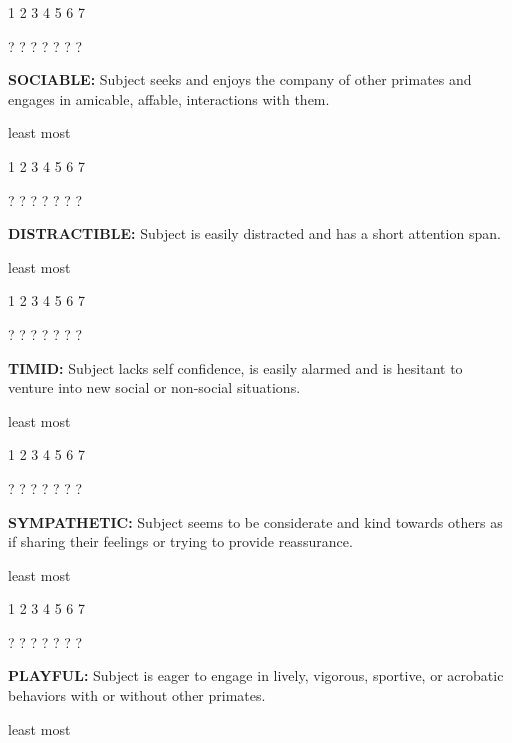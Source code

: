 \documentclass{article} %
\begin{document}
  1    2    3    4    5    6    7   

  ?    ?    ?    ?    ?    ?    ?   

\noindent  

\noindent \textbf{SOCIABLE:} Subject seeks and enjoys the company of other primates and engages in amicable, affable, interactions with them. 

\noindent  

\noindent least                            most

  1    2    3    4    5    6    7   

  ?    ?    ?    ?    ?    ?    ?   

\noindent  

\noindent \textbf{DISTRACTIBLE:} Subject is easily distracted and has a short attention span. 

\noindent  

\noindent least                            most

  1    2    3    4    5    6    7   

  ?    ?    ?    ?    ?    ?    ?   

\noindent  

\noindent \textbf{TIMID:} Subject lacks self confidence, is easily alarmed and is hesitant to venture into new social or non-social situations. 

\noindent  

\noindent least                            most

  1    2    3    4    5    6    7   

  ?    ?    ?    ?    ?    ?    ?   

\noindent \textbf{ }

\noindent \textbf{SYMPATHETIC:} Subject seems to be considerate and kind towards others as if sharing their feelings or trying to provide reassurance. 

\noindent  

\noindent least                            most

  1    2    3    4    5    6    7   

  ?    ?    ?    ?    ?    ?    ?   

\noindent \textbf{ }

\noindent \textbf{PLAYFUL:} Subject is eager to engage in lively, vigorous, sportive, or acrobatic behaviors with or without other primates. 

\noindent  

\noindent least                            most
\end{document}
